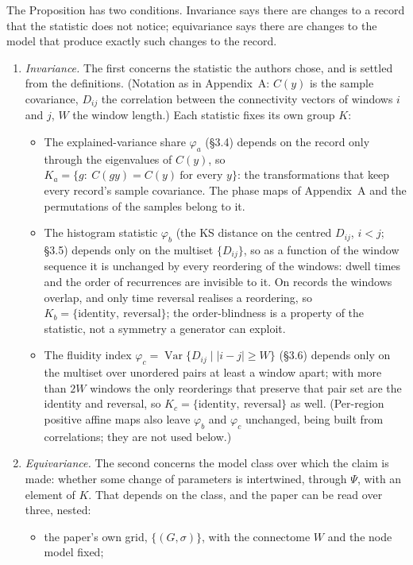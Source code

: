 \documentclass[11pt]{article}
\begin{document}
The Proposition has two conditions. Invariance says there are changes to a record that the statistic does not notice; equivariance says there are changes to the model that produce exactly such changes to the record.
\begin{enumerate}
\item[(i)] \emph{Invariance.} The first concerns the statistic the authors chose, and is settled from the definitions. (Notation as in Appendix~A: $C(y)$ is the sample covariance, $D_{ij}$ the correlation between the connectivity vectors of windows $i$ and $j$, $W$ the window length.) Each statistic fixes its own group $K$:
  \begin{itemize}
  \item[(a)] The explained-variance share $\varphi_a$ (\S3.4) depends on the record only through the eigenvalues of $C(y)$, so
  $K_a=\{g:\ C(gy)=C(y)\ \text{for every } y\}$: the transformations that keep every record's sample covariance. The phase maps of Appendix~A and the permutations of the samples belong to it.
  \item[(b)] The histogram statistic $\varphi_b$ (the KS distance on the centred $D_{ij}$, $i<j$; \S3.5) depends only on the multiset $\{D_{ij}\}$, so as a function of the window sequence it is unchanged by every reordering of the windows: dwell times and the order of recurrences are invisible to it. On records the windows overlap, and only time reversal realises a reordering, so $K_b=\{\text{identity},\ \text{reversal}\}$; the order-blindness is a property of the statistic, not a symmetry a generator can exploit.
  \item[(c)] The fluidity index $\varphi_c=\operatorname{Var}\{D_{ij}\mid |i-j|\ge W\}$ (\S3.6) depends only on the multiset over unordered pairs at least a window apart; with more than $2W$ windows the only reorderings that preserve that pair set are the identity and reversal, so $K_c=\{\text{identity},\ \text{reversal}\}$ as well. (Per-region positive affine maps also leave $\varphi_b$ and $\varphi_c$ unchanged, being built from correlations; they are not used below.)
  \end{itemize}
\item[(ii)] \emph{Equivariance.} The second concerns the model class over which the claim is made: whether some change of parameters is intertwined, through $\Psi$, with an element of $K$. That depends on the class, and the paper can be read over three, nested:
  \begin{itemize}
  \item[$\Theta_1$] the paper's own grid, $\{(G,\sigma)\}$, with the connectome $W$ and the node model fixed;

\end{itemize}
\end{enumerate}
\end{document}
